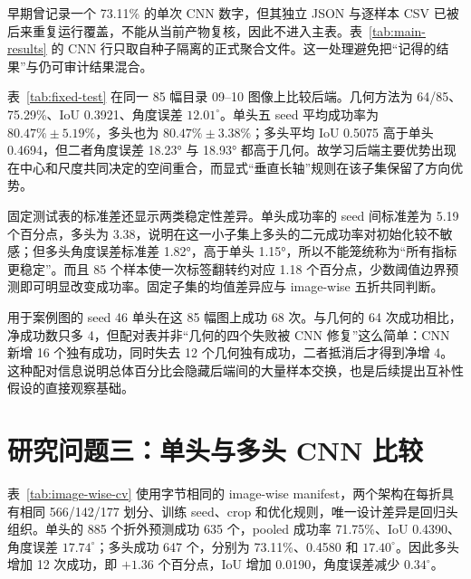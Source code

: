 \documentclass{l4proj}
\begin{document}
早期曾记录一个 73.11\% 的单次 CNN 数字，但其独立 JSON 与逐样本 CSV 已被后来重复运行覆盖，不能从当前产物复核，因此不进入主表。表~\ref{tab:main-results} 的 CNN 行只取自种子隔离的正式聚合文件。这一处理避免把“记得的结果”与仍可审计结果混合。

表~\ref{tab:fixed-test} 在同一 85 幅目录 09--10 图像上比较后端。几何方法为 64/85、75.29\%、IoU 0.3921、角度误差 $12.01^\circ$。单头五 seed 平均成功率为 $80.47\%\pm5.19\%$，多头也为 $80.47\%\pm3.38\%$；多头平均 IoU 0.5075 高于单头 0.4694，但二者角度误差 18.23° 与 18.93° 都高于几何。故学习后端主要优势出现在中心和尺度共同决定的空间重合，而显式“垂直长轴”规则在该子集保留了方向优势。

\begin{table}[htbp]
  \centering
  \caption{固定 85 样本测试子集（目录 09--10）结果。CNN 为随机种子 42--46 的均值 $\pm$ 总体标准差。}
  \label{tab:fixed-test}
\end{table}

固定测试表的标准差还显示两类稳定性差异。单头成功率的 seed 间标准差为 5.19 个百分点，多头为 3.38，说明在这一小子集上多头的二元成功率对初始化较不敏感；但多头角度误差标准差 1.82°，高于单头 1.15°，所以不能笼统称为“所有指标更稳定”。而且 85 个样本使一次标签翻转约对应 1.18 个百分点，少数阈值边界预测即可明显改变成功率。固定子集的均值差异应与 image-wise 五折共同判断。

用于案例图的 seed 46 单头在这 85 幅图上成功 68 次。与几何的 64 次成功相比，净成功数只多 4，但配对表并非“几何的四个失败被 CNN 修复”这么简单：CNN 新增 16 个独有成功，同时失去 12 个几何独有成功，二者抵消后才得到净增 4。这种配对信息说明总体百分比会隐藏后端间的大量样本交换，也是后续提出互补性假设的直接观察基础。

\section{研究问题三：单头与多头 CNN 比较}
表~\ref{tab:image-wise-cv} 使用字节相同的 image-wise manifest，两个架构在每折具有相同 566/142/177 划分、训练 seed、crop 和优化规则，唯一设计差异是回归头组织。单头的 885 个折外预测成功 635 个，pooled 成功率 71.75\%、IoU 0.4390、角度误差 $17.74^\circ$；多头成功 647 个，分别为 73.11\%、0.4580 和 $17.40^\circ$。因此多头增加 12 次成功，即 $+1.36$ 个百分点，IoU 增加 0.0190，角度误差减少 $0.34^\circ$。
\end{document}
